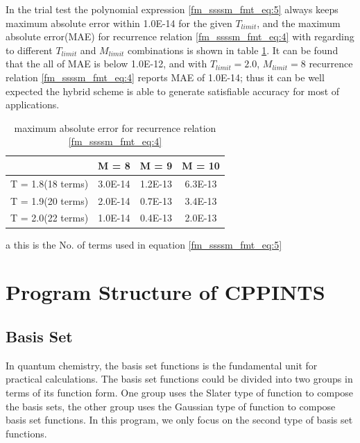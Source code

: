 In the trial test the polynomial expression \ref{fm_ssssm_fmt_eq:5} 
always keeps maximum absolute error within 1.0E-14 for the given $T_{limit}$, and the 
maximum absolute error(MAE) for recurrence relation \ref{fm_ssssm_fmt_eq:4} with regarding to 
different $T_{limit}$ and $M_{limit}$ combinations is shown in table \ref{table:1}. 
It can be found that the all of MAE is below 1.0E-12, and 
with $T_{limit}=2.0$, $M_{limit}=8$ recurrence relation \ref{fm_ssssm_fmt_eq:4} reports
MAE of 1.0E-14; thus it can be well expected the hybrid scheme is able to generate satisfiable
accuracy for most of applications.

\begin{table}
\caption{maximum absolute error for recurrence relation \ref{fm_ssssm_fmt_eq:4}}
\label{table:1}
\begin{center}
\begin{threeparttable}
\begin{tabular}{c|c|c|c}
\hline
                    &       M = 8         &      M = 9        &   M = 10          \\
\hline
T = 1.8(18 terms)\tnote{a}   
                    &       3.0E-14       &      1.2E-13      &   6.3E-13         \\
\hline
T = 1.9(20 terms)   &       2.0E-14       &      0.7E-13      &   3.4E-13         \\
\hline
T = 2.0(22 terms)   &       1.0E-14       &      0.4E-13      &   2.0E-13         \\
\hline
\end{tabular}
\begin{tablenotes}
    \item[a] this is the No. of terms used in equation \ref{fm_ssssm_fmt_eq:5}
\end{tablenotes}
\end{threeparttable}
\end{center}
\end{table} 

\chapter{Program Structure of CPPINTS}

\section{Basis Set}
%
%
\label{bs}

In quantum chemistry, the basis set functions is the fundamental 
unit for practical calculations\cite{Davidson_Feller_CR_86_681_1986}. 
The basis set functions could be 
divided into two groups in terms of its function form. One group
uses the Slater type of function to compose the basis sets, 
the other group uses the Gaussian type of function to compose 
basis set functions. In this program, we only focus on the 
second type of basis set functions.

